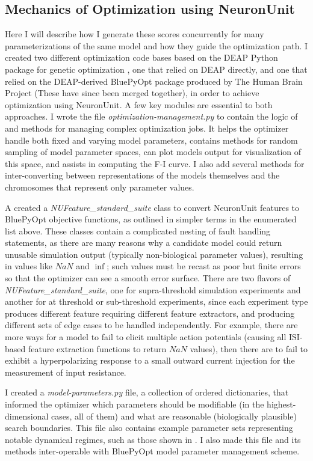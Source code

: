 \subsection{Mechanics of Optimization using NeuronUnit}
Here I will describe how I generate these scores concurrently for many parameterizations of the same model and how they guide the optimization path.
I created two different optimization code bases based on the DEAP Python package for genetic optimization \citep{DEAP_JMLR2012}, one that relied on DEAP directly, and one that relied on the DEAP-derived BluePyOpt package produced by The Human Brain Project \citep{bluepyopt} (These have since been merged together), in order to achieve optimization using NeuronUnit.
A few key modules are essential to both approaches.
I wrote the file \emph{optimization-management.py} to contain the logic of and methods for managing complex optimization jobs.
It helps the optimizer handle both fixed and varying  model parameters, contains methods for random sampling of model parameter spaces, can plot models output for visualization of this space, and assists in computing the F-I curve.
I also add several methods for inter-converting between representations of the models themselves and the chromosomes that represent only parameter values.

A created a \emph{NUFeature\_standard\_suite} class to convert NeuronUnit features to BluePyOpt objective functions, as outlined in simpler terms in the enumerated list above.
These classes contain a complicated nesting of fault handling statements, as there are many reasons why a candidate model could return unusable simulation output (typically non-biological parameter values), resulting in values like $NaN$ and $\inf$; such values must be recast as poor but finite errors so that the optimizer can see a smooth error surface.
There are two flavors of \emph{NUFeature\_standard\_suite}, one for supra-threshold simulation experiments and another for at threshold or sub-threshold experiments, since each experiment type produces different feature requiring different feature extractors, and producing different sets of edge cases to be handled independently.
For example, there are more ways for a model to fail to elicit multiple action potentials (causing all ISI-based feature extraction functions to return $NaN$ values), then there are to fail to exhibit a hyperpolarizing response to a small outward current injection for the measurement of input resistance.
 
I created a \emph{model-parameters.py} file, a collection of ordered dictionaries, that informed the optimizer which parameters should be modifiable (in the highest-dimensional cases, all of them) and what are reasonable (biologically plausible) search boundaries.
This file also contains example parameter sets representing notable dynamical regimes, such as those shown in \cite{izhikevich2003simple}.
I also made this file and its methods inter-operable with BluePyOpt model parameter management scheme.

